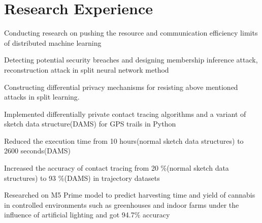 \documentclass[]{deedy-resume-openfont}
\begin{document}
\begin{minipage}[t]{0.66\textwidth} 


\section{Research Experience}
\vspace{3mm}
\begin{tightemize}
\item Conducting research on pushing the resource and communication efficiency limits of distributed machine learning
\item  Detecting potential security breaches and designing membership inference attack, reconstruction attack in split neural network method
\item Constructing differential privacy mechanisms for resisting above mentioned attacks in split learning.
\end{tightemize}
\sectionsep

\vspace{3mm} %
\begin{tightemize}
\item Implemented differentially private contact tracing algorithms and a variant of sketch data structure(DAMS) for GPS trails in Python 
\item Reduced the execution time from 10 hours(normal sketch data structures) to 2600 seconds(DAMS)
\item Increased the accuracy of contact tracing from 20 \%(normal sketch data structures) to 93 \%(DAMS) in trajectory datasets
\end{tightemize}
\sectionsep

\begin{tightemize}
\item Researched on M5 Prime model to predict harvesting time and yield of cannabis in controlled environments such as greenhouses and indoor farms under the influence of artificial lighting and got 94.7\% accuracy
\end{tightemize}
\sectionsep


\end{minipage}
\end{document}
